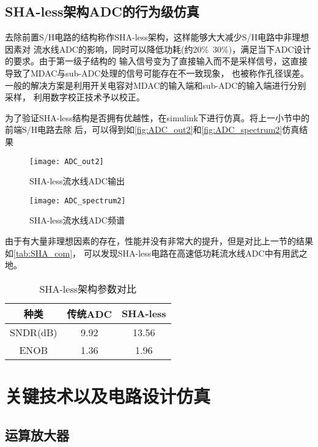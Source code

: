 \subsection{SHA-less架构ADC的行为级仿真}
    去除前置S/H电路的结构称作SHA-less架构，这样能够大大减少S/H电路中非理想因素对
    流水线ADC的影响，同时可以降低功耗(约20\%~30\%)，满足当下ADC设计的要求。由于第一级子结构的
    输入信号变为了直接输入而不是采样信号，这直接导致了MDAC与sub-ADC处理的信号可能存在不一致现象，
    也被称作孔径误差。一般的解决方案是利用开关电容对MDAC的输入端和sub-ADC的输入端进行分别采样，
    利用数字校正技术予以校正。
    \par 为了验证SHA-less结构是否拥有优越性，在simulink下进行仿真。将上一小节中的前端S/H电路去除
    后，可以得到如\autoref{fig:ADC_out2}和\autoref{fig:ADC_spectrum2}仿真结果
    \begin{figure}[H]
        \centering
        \texttt{[image: ADC\_out2]}
        \caption{\label{fig:ADC_out2}SHA-less流水线ADC输出}
    \end{figure}
    \begin{figure}[H]
        \centering
        \texttt{[image: ADC\_spectrum2]}
        \caption{\label{fig:ADC_spectrum2}SHA-less流水线ADC频谱}
    \end{figure}
    \par 由于有大量非理想因素的存在，性能并没有非常大的提升，但是对比上一节的结果如\autoref{tab:SHA_com}，
    可以发现SHA-less电路在高速低功耗流水线ADC中有用武之地。
    \begin{table}[ht]
        \centering
        \caption{\label{tab:SHA_com}SHA-less架构参数对比}
        \begin{tabular}{|c|c|c|}
            \hline
            种类 & 传统ADC & SHA-less \\ \hline
            SNDR(dB) & 9.92 & 13.56 \\ \hline
            ENOB & 1.36 & 1.96   \\ \hline
        \end{tabular}
    \end{table}


\section{关键技术以及电路设计仿真}
\subsection{运算放大器}

